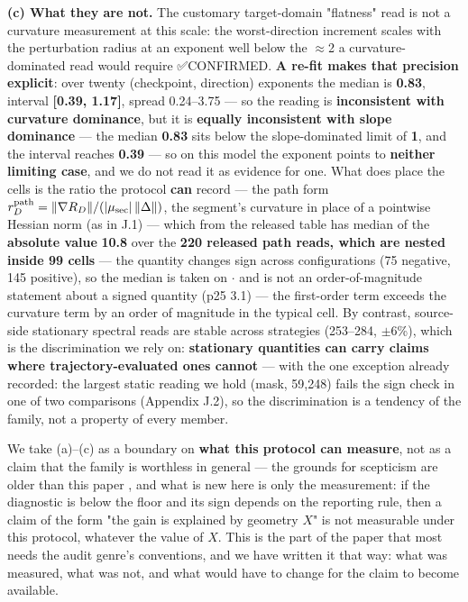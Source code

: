 \documentclass[pdflatex,sn-mathphys-ay]{sn-jnl}
\begin{document}
\textbf{(c) What they are not.} The customary target-domain "flatness" read is not a curvature measurement at this scale: the worst-direction increment scales with the perturbation radius at an exponent well below the \ensuremath{\approx}2 a curvature-dominated read would require ✅CONFIRMED. \textbf{A re-fit makes that precision explicit}: over twenty (checkpoint, direction) exponents the median is \textbf{0.83}, interval \textbf{[0.39, 1.17]}, spread 0.24--3.75 --- so the reading is \textbf{inconsistent with curvature dominance}, but it is \textbf{equally inconsistent with slope dominance} --- the median \textbf{0.83} sits below the slope-dominated limit of \textbf{1}, and the interval reaches \textbf{0.39} --- so on this model the exponent points to \textbf{neither limiting case}, and we do not read it as evidence for one. What does place the cells is the ratio the protocol \textbf{can} record --- the path form $r^{\rm path}_D=\|\nabla R_D\|/(|\mu_{\rm sec}|\,\|\Delta\|)$, the segment's curvature in place of a pointwise Hessian norm (as in J.1) --- which from the released table has median of the \textbf{absolute value} \textbf{10.8} over the \textbf{220 released path reads, which are nested inside 99 cells} --- the quantity changes sign across configurations (75 negative, 145 positive), so the median is taken on \textbar{}\ensuremath{\cdot}\textbar{} and is not an order-of-magnitude statement about a signed quantity (p25 3.1) --- the first-order term exceeds the curvature term by an order of magnitude in the typical cell. By contrast, source-side stationary spectral reads are stable across strategies (253--284, \ensuremath{\pm}6\%), which is the discrimination we rely on: \textbf{stationary quantities can carry claims where trajectory-evaluated ones cannot} --- with the one exception already recorded: the largest static reading we hold (mask, 59,248) fails the sign check in one of two comparisons (Appendix J.2), so the discrimination is a tendency of the family, not a property of every member.

We take (a)--(c) as a boundary on \textbf{what this protocol can measure}, not as a claim that the family is worthless in general --- the grounds for scepticism are older than this paper \citep{andriushchenko2023,dziugaite2020}, and what is new here is only the measurement: if the diagnostic is below the floor and its sign depends on the reporting rule, then a claim of the form "the gain is explained by geometry $X$" is not measurable under this protocol, whatever the value of $X$. This is the part of the paper that most needs the audit genre's conventions, and we have written it that way: what was measured, what was not, and what would have to change for the claim to become available.
\end{document}
